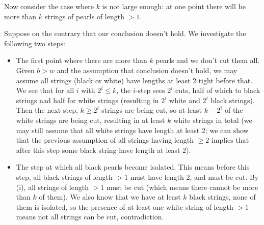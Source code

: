 \documentclass[11pt]{article}
\newcommand{\<}{\langle}
\renewcommand{\>}{\rangle}
\begin{document}
\begin{enumerate}
	Now consider the case where $k$ is not large enough: at one point there will be more than $k$ strings of pearls of length $>1$.
	\iffalse
	Lemma: at any time there exists a black string of length $b_0$ and white string of length $w_0$ such that $w_0\le 2b_0-1$. 
	
	Proof: this is true with $w<b$ in the beginning. Suppose that at some step this invariant is maintained. We now have two cases: whether there are black strings strictly longer than white strings. In the positive case, let the black strings and white strings to have length $b_0$ and $w_0$ respectively. 
	No operation can increase any string length, so if the black string is not cut after an operation, we're good. Otherwise, the longer of black string has length $\lceil \frac{b_0}{2}\rceil\ge \lceil \frac{w_0+1}{2}\rceil$ which in cny case will satisfy $2\lceil \frac{w_0+1}{2}\rceil-1\ge w_0$. This finishes the induction step. 
	In the negative case, though, all white strings are being cut before the black string. 
	Let black string of length $b_0$ and white string of length $w_0$ satisfy $w_0\le 2b_0-1$, then if black string is not cut, the inequality still holds true. If black string is cut, white string is cut, too. Now we shall compare $\lceil \frac{b_0}{2}\rceil$ and $\lfloor \frac{w_0}{2}\rfloor$ and we have 
	\[
	\lfloor \frac{w_0}{2}\rfloor\le \lfloor \frac{2b_0-1}{2}\rfloor\le b_0-1\le 2\lceil\frac{b_0}{2}\rceil - 1
	\]
	as desired. 
	\fi
	Suppose on the contrary that our conclusion doesn't hold. We investigate the following two steps: 
	\begin{itemize}
		\item The first point where there are more than $k$ pearls and we don't cut them all. Given $b>w$ and the assumption that conclusion doesn't hold, we may assume all strings (black or white) have lengths at least 2 tight before that. We see that for all $i$ with $2^i\le k$, the $i$-step sees $2^i$ cuts, half of which to black strings nad half for white strings (resulting in $2^i$ white and $2^i$ black strings). 
		Then the next step, $k\ge 2^i$ strings are being cut, so at least $k-2^i$ of the white strings are being cut, resulting in at least $k$ white strings in total (we may still assume that all white strings have length at least 2; we can show that the previous assumption of all strings having length $\ge 2$ implies that after this step some black string have length at least 2). 
		
		\item The step at which all black pearls become isolated. This means before this step, all black strings of length $>1$ must have length 2, and must be cut. By (i), all strings of length $>1$ must be cut (which means there cannot be more than $k$ of them). We also know that we have at least $k$ black strings, none of them is isolated, so the presence of at least one white string of length $>1$ means not all strings can be cut, contradiction. 
	\end{itemize}
\end{enumerate}
\end{document}
